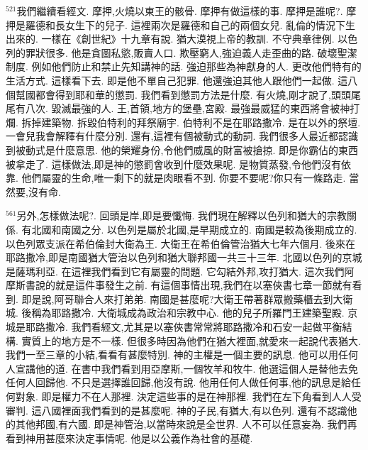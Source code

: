 \documentclass{book}
\begin{document}
$^{521}$我們繼續看經文.
摩押,火燒以東王的骸骨.
摩押有做這樣的事.
摩押是誰呢?.
摩押是羅德和長女生下的兒子.
這裡兩次是羅德和自己的兩個女兒.
亂倫的情況下生出來的.
一樣在《創世紀》十九章有說.
猶大漠視上帝的教訓.
不守典章律例.
以色列的罪狀很多.
他是貪圖私慾,販賣人口.
欺壓窮人,強迫義人走歪曲的路.
破壞聖潔制度.
例如他們防止和禁止先知講神的話.
強迫那些為神獻身的人.
更改他們特有的生活方式.
這樣看下去.
即是他不單自己犯罪.
他還強迫其他人跟他們一起做.
這八個幫國都會得到耶和華的懲罰.
我們看到懲罰方法是什麼.
有火燒,剛才說了,頭頭尾尾有八次.
毀滅最強的人.
王,首領,地方的堡壘,宮殿.
最強最威猛的東西將會被神打爛.
拆掉建築物.
拆毀伯特利的拜祭廟宇.
伯特利不是在耶路撒冷.
是在以外的祭壇.
一會兒我會解釋有什麼分別.
還有,這裡有個被動式的動詞.
我們很多人最近都認識到被動式是什麼意思.
他的榮耀身份,令他們威風的財富被搶掠.
即是你霸佔的東西被拿走了.
這樣做法,即是神的懲罰會收到什麼效果呢.
是物質蒸發,令他們沒有依靠.
他們屬靈的生命,唯一剩下的就是肉眼看不到.
你要不要呢?你只有一條路走.
當然要,沒有命.

$^{561}$另外,怎樣做法呢?.
回頭是岸,即是要懺悔.
我們現在解釋以色列和猶大的宗教關係.
有北國和南國之分.
以色列是屬於北國,是早期成立的.
南國是較為後期成立的.
以色列眾支派在希伯倫封大衛為王.
大衛王在希伯倫管治猶大七年六個月.
後來在耶路撒冷,即是南國猶大管治以色列和猶大聯邦國一共三十三年.
北國以色列的京城是薩瑪利亞.
在這裡我們看到它有屬靈的問題.
它勾結外邦,攻打猶大.
這次我們阿摩斯書說的就是這件事發生之前.
有這個事情出現,我們在以塞俠書七章一節就有看到.
即是說,阿哥聯合人來打弟弟.
南國是甚麼呢?大衛王帶著群眾搬藥櫃去到大衛城.
後稱為耶路撒冷.
大衛城成為政治和宗教中心.
他的兒子所羅門王建築聖殿.
京城是耶路撒冷.
我們看經文,尤其是以塞俠書常常將耶路撒冷和石安一起做平衡結構.
實質上的地方是不一樣.
但很多時因為他們在猶大裡面,就愛來一起說代表猶大.
我們一至三章的小結,看看有甚麼特別.
神的主權是一個主要的訊息.
他可以用任何人宣講他的道.
在書中我們看到用亞摩斯,一個牧羊和牧牛.
他選這個人是替他去免任何人回歸他.
不只是選擇誰回歸,他沒有說.
他用任何人做任何事,他的訊息是給任何對象.
即是權力不在人那裡.
決定這些事的是在神那裡.
我們在左下角看到人人受審判.
這八國裡面我們看到的是甚麼呢.
神的子民,有猶大,有以色列.
還有不認識他的其他邦國,有六國.
即是神管治,以當時來說是全世界.
人不可以任意妄為.
我們再看到神用甚麼來決定事情呢.
他是以公義作為社會的基礎.
\end{document}
